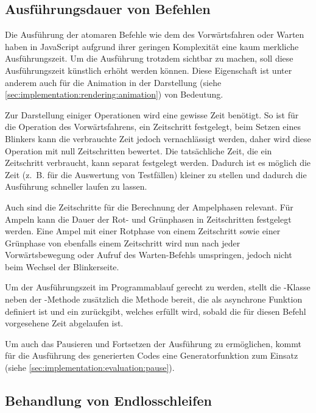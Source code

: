 \subsection{Ausführungsdauer von Befehlen}
\label{sec:implementation:evaluation:execution-time}

Die Ausführung der atomaren Befehle wie dem des Vorwärtsfahren oder Warten haben in JavaScript aufgrund ihrer geringen Komplexität eine kaum merkliche Ausführungszeit. Um die Ausführung trotzdem sichtbar zu machen, soll diese Ausführungszeit künstlich erhöht werden können. Diese Eigenschaft ist unter anderem auch für die Animation in der Darstellung (siehe \ref{sec:implementation:rendering:animation}) von Bedeutung.

Zur Darstellung einiger Operationen wird eine gewisse Zeit benötigt. So ist für die Operation des Vorwärtsfahrens, ein Zeitschritt festgelegt, beim Setzen eines Blinkers kann die verbrauchte Zeit jedoch vernachlässigt werden, daher wird diese Operation mit null Zeitschritten bewertet. Die tatsächliche Zeit, die ein Zeitschritt verbraucht, kann separat festgelegt werden. Dadurch ist es möglich die Zeit (z.~B. für die Auswertung von Testfällen) kleiner zu stellen und dadurch die Ausführung schneller laufen zu lassen.

Auch sind die Zeitschritte für die Berechnung der Ampelphasen relevant. Für Ampeln kann die Dauer der Rot- und Grünphasen in Zeitschritten festgelegt werden. Eine Ampel mit einer Rotphase von einem Zeitschritt sowie einer Grünphase von ebenfalls einem Zeitschritt wird nun nach jeder Vorwärtsbewegung oder Aufruf des Warten-Befehls umspringen, jedoch nicht beim Wechsel der Blinkerseite.

Um der Ausführungszeit im Programmablauf gerecht zu werden, stellt die -Klasse neben der -Methode zusätzlich die Methode  bereit, die als asynchrone Funktion definiert ist und ein  zurückgibt, welches erfüllt wird, sobald die für diesen Befehl vorgesehene Zeit abgelaufen ist.

Um auch das Pausieren und Fortsetzen der Ausführung zu ermöglichen, kommt für die Ausführung des generierten Codes eine Generatorfunktion zum Einsatz (siehe \ref{sec:implementation:evaluation:pause}).

\subsection{Behandlung von Endlosschleifen}
\label{sec:implementation:evaluation:infinite-loop}

